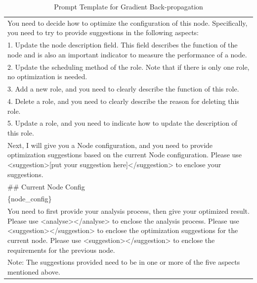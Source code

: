 \begin{table}[htbp]
{\begin{tabular}{p{15cm}}
You need to decide how to optimize the configuration of this node. Specifically, you need to try to provide suggestions in the following aspects:\\
1. Update the node description field. This field describes the function of the node and is also an important indicator to measure the performance of a node.\\
2. Update the scheduling method of the role. Note that if there is only one role, no optimization is needed.\\
3. Add a new role, and you need to clearly describe the function of this role.\\
4. Delete a role, and you need to clearly describe the reason for deleting this role.\\
5. Update a role, and you need to indicate how to update the description of this role.\par\\


Next, I will give you a Node configuration, and you need to provide optimization suggestions based on the current Node configuration. Please use <suggestion>[put your suggestion here]</suggestion> to enclose your suggestions.\par\\

\#\# Current Node Config\\
\{node\_config\}\par\\

You need to first provide your analysis process, then give your optimized result. Please use <analyse></analyse> to enclose the analysis process. Please use <suggestion></suggestion> to enclose the optimization suggestions for the current node. Please use <suggestion></suggestion> to enclose the requirements for the previous node.\\

Note: The suggestions provided need to be in one or more of the five aspects mentioned above.\\
    \bottomrule
    \end{tabular}}
    \caption{Prompt Template for Gradient Back-propagation}
    \label{tab:prompt_back_propagation}
\end{table}


